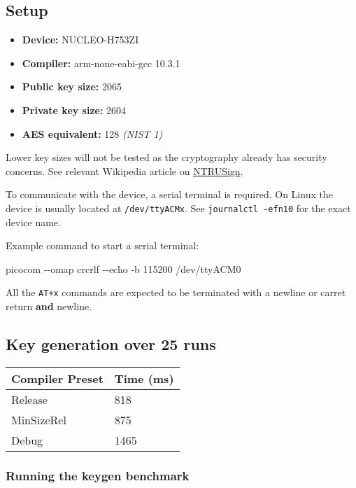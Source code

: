 \documentclass[
]{article}
\newenvironment{Shaded}{}{}
\newcommand{\ExtensionTok}[1]{#1}
\newcommand{\NormalTok}[1]{#1}
\providecommand{\tightlist}{%
  \setlength{\itemsep}{0pt}\setlength{\parskip}{0pt}}
\begin{document}
\hypertarget{setup}{%
\subsection{Setup}\label{setup}}

\begin{itemize}
\tightlist
\item
  \textbf{Device:} NUCLEO-H753ZI
\item
  \textbf{Compiler:} arm-none-eabi-gcc 10.3.1
\item
  \textbf{Public key size:} 2065
\item
  \textbf{Private key size:} 2604
\item
  \textbf{AES equivalent:} 128 \textit{(NIST 1)}
\end{itemize}

Lower key sizes will not be tested as the cryptography already
has security concerns.
See relevant Wikipedia article on
\href{https://en.wikipedia.org/wiki/NTRUSign}{NTRUSign}.

To communicate with the device, a serial terminal is required. On Linux
the device is usually located at \texttt{/dev/ttyACMx}. See
\texttt{journalctl\ -efn10} for the exact device name.

Example command to start a serial terminal:

\begin{Shaded}
\begin{Highlighting}[]
\ExtensionTok{picocom}\NormalTok{ {-}{-}omap crcrlf {-}{-}echo {-}b 115200 /dev/ttyACM0}
\end{Highlighting}
\end{Shaded}

All the \texttt{AT+x} commands are expected to be terminated with a
newline or carret return \textbf{and} newline.

\hypertarget{key-generation-over-25-runs}{%
\subsection{Key generation over 25
runs}\label{key-generation-over-25-runs}}

\begin{longtable}[]{@{}ll@{}}
\toprule
Compiler Preset & Time (ms)\tabularnewline
\midrule
\endhead
Release & 818\tabularnewline
MinSizeRel & 875\tabularnewline
Debug & 1465\tabularnewline
\bottomrule
\end{longtable}

\hypertarget{running-the-keygen-benchmark}{%
\subsubsection{Running the keygen
benchmark}\label{running-the-keygen-benchmark}}
\end{document}
